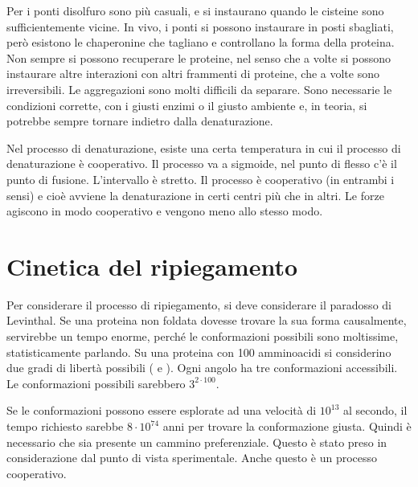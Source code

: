 Per i ponti disolfuro sono più casuali, e si instaurano quando le
cisteine sono sufficientemente vicine. In vivo, i ponti  si possono
instaurare in posti sbagliati, però esistono le chaperonine che tagliano
e controllano la forma della proteina.
Non sempre si possono recuperare le proteine, nel senso che a volte si
possono instaurare altre interazioni con altri frammenti di proteine, 
che a volte sono irreversibili. Le aggregazioni sono molti difficili da
separare.
Sono necessarie le condizioni corrette, con i giusti enzimi o il giusto
ambiente e, in teoria, si potrebbe sempre tornare indietro dalla
denaturazione.

Nel processo di denaturazione, esiste una certa temperatura in cui il
processo di denaturazione è cooperativo. Il processo va a sigmoide, nel
punto di flesso c'è il punto di fusione. L'intervallo è stretto.
Il processo è cooperativo (in entrambi i sensi) e cioè avviene la
denaturazione in certi centri più che in altri. Le forze agiscono in
modo cooperativo e vengono meno allo stesso modo.


\section{Cinetica del ripiegamento}

Per considerare il processo di ripiegamento, si deve considerare il
paradosso di Levinthal. Se una proteina non foldata dovesse trovare la
sua forma causalmente, servirebbe un tempo enorme, perché le
conformazioni possibili sono moltissime, statisticamente parlando.
Su una proteina con 100 amminoacidi si considerino due gradi di libertà
possibili (\psi{} e \phi). Ogni angolo ha tre conformazioni accessibili.
Le conformazioni possibili sarebbero \(3^{2 \cdot 100}\).

Se le conformazioni possono essere esplorate ad una velocità di $10^{13}$
al secondo, il tempo richiesto sarebbe $8 \cdot 10^{74}$ anni per
trovare la conformazione giusta.
Quindi è necessario che sia presente un cammino preferenziale.
Questo è stato preso in considerazione dal punto di vista sperimentale.
Anche questo è un processo cooperativo.

